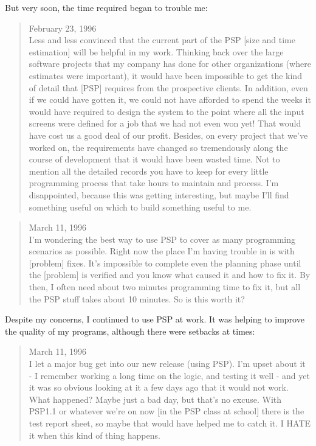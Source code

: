 But very soon, the time required began to trouble me:
\begin{quote}
  February 23, 1996\\
  Less and less convinced that the current part of the PSP [size and time
  estimation] will be helpful in my work.  Thinking back over the large
  software projects that my company has done for other organizations (where
  estimates were important), it would have been impossible to get the kind
  of detail that [PSP] requires from the prospective clients.  In addition,
  even if we could have gotten it, we could not have afforded to spend the
  weeks it would have required to design the system to the point where all
  the input screens were defined for a job that we had not even won yet!
  That would have cost us a good deal of our profit.  Besides, on every
  project that we've worked on, the requirements have changed so
  tremendously along the course of development that it would have been
  wasted time.  Not to mention all the detailed records you have to keep
  for every little programming process that take hours to maintain and
  process.  I'm disappointed, because this was getting interesting, but
  maybe I'll find something useful on which to build something useful to
  me.
\end{quote}

\begin{quote}
  March 11, 1996\\
  I'm wondering the best way to use PSP to cover as many programming
  scenarios as possible.  Right now the place I'm having trouble in is with
  [problem] fixes.  It's impossible to complete even the planning phase
  until the [problem] is verified and you know what caused it and how to
  fix it.  By then, I often need about two minutes programming time to fix
  it, but all the PSP stuff takes about 10 minutes.  So is this worth it?
\end{quote}

Despite my concerns, I continued to use PSP at work. It was helping to
improve the quality of my programs, although there were setbacks at times:
\begin{quote}
  March 11, 1996\\
  I let a major bug get into our new release (using PSP).  I'm upset about
  it - I remember working a long time on the logic, and testing it well -
  and yet it was so obvious looking at it a few days ago that it would not
  work.  What happened?  Maybe just a bad day, but that's no excuse. With
  PSP1.1 or whatever we're on now [in the PSP class at school] there is the
  test report sheet, so maybe that would have helped me to catch it.  I
  HATE it when this kind of thing happens.
\end{quote}

